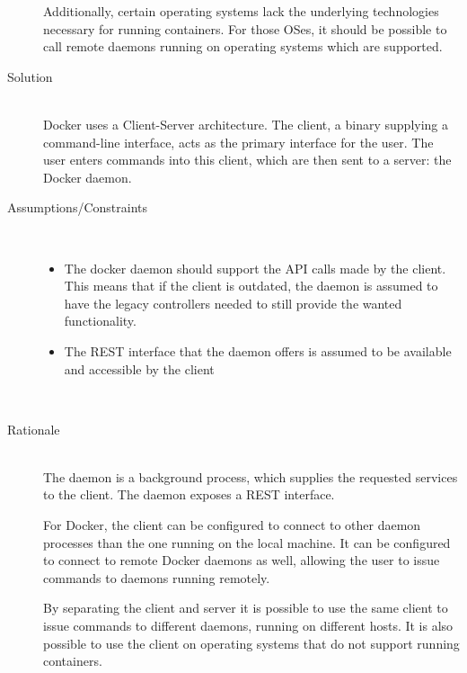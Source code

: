\begin{description}
Additionally, certain operating systems lack the underlying technologies necessary for running containers. For those OSes, it should be possible to call remote daemons running on operating systems which are supported. %

\item [Solution]~\\
Docker uses a {Client-Server} architecture. The client, a binary supplying a command-line interface, acts as the primary interface for the user. The user enters commands into this client, which are then sent to a server: the Docker daemon. 


\item [Assumptions/Constraints]~
\begin{itemize}
\item The docker daemon should support the API calls made by the client. This means that if the client is outdated, the daemon is assumed to have the legacy controllers needed to still provide the wanted functionality.


\item The REST interface that the daemon offers is assumed to be available and accessible by the client
\end{itemize}
~\\[-1.7cm]

\item [Rationale] ~\\
The daemon is a background process, which supplies the requested services to the client. The daemon exposes a REST interface.

For Docker, the client can be configured to connect to other daemon processes than the one running on the local machine. It can be configured to connect to remote Docker daemons as well, allowing the user to issue commands to daemons running remotely.


By separating the client and server it is possible to use the same client to issue commands to different daemons, running on different hosts.
It is also possible to use the client on operating systems that do not support running containers.


\end{description}

